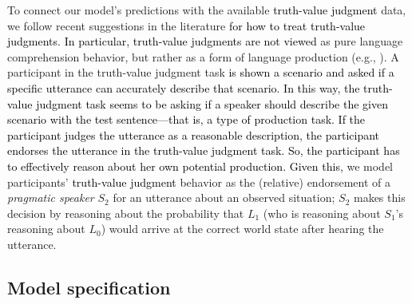 \documentclass[cm]{glossa}
\newcommand{\lp}[1]{\textcolor{black}{#1}} %
\begin{document}
To connect our model's predictions with the available %
\lp{truth-value judgment}
data, we follow recent suggestions in the literature 
\lp{for how to treat truth-value judgments.}
\lp{In particular, truth-value judgments are not viewed}
as pure language comprehension behavior, but rather as a form of language production (e.g., \citealp{degengoodman2014, jasbietal2019}).
A participant in the truth-value judgment task \lp{is shown a scenario and asked if a specific utterance can accurately describe that scenario. In this way, the truth-value judgment task seems to be asking if a speaker should describe the given scenario with the test sentence---that is, a type of production task.
}
\lp{If the participant judges the utterance as a reasonable description, the participant endorses the utterance in the truth-value judgment task. So, the participant has to effectively reason about her own potential production.}
\lp{Given this,}
we model participants' 
\lp{truth-value judgment}
behavior as the (relative) endorsement of  a \textit{pragmatic speaker} $S_2$ for an utterance about an observed situation; $S_2$ makes this decision by reasoning about the probability that $L_1$ (who is reasoning about $S_1$'s reasoning about $L_0$) would arrive at the correct world state after hearing the utterance. 


\subsection{Model specification}
\end{document}
